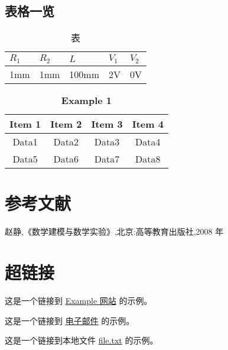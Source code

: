 \documentclass[12pt,a4paper]{article}%
\begin{document}
\subsection{表格一览}
\begin{table}[H]%
	\centering
	\begin{tabular}{|l|l|l|l|l|}
		\hline
		$R_1$ & $R_2$ & $L$ & $V_1$ & $V_2$ \\ \hline
		1mm & 1mm & 100mm & 2V & 0V \\ \hline
	\end{tabular}
\caption{\fontsize{10pt}{15pt}\selectfont 表}
\end{table}
\begin{table}[H]
	\caption{\textbf{Example 1}}%
	\centering%
	\begin{tabular}{cccc}%
	\toprule%
	Item 1&Item 2&Item 3&Item 4 \\
	\midrule%
	Data1&Data2&Data3&Data4 \\
	Data5&Data6&Data7&Data8 \\
	\bottomrule%
	\end{tabular}
\end{table}

\newpage
\section{参考文献}

\begin{thebibliography}{100}%

    赵静,《数学建模与数学实验》,北京:高等教育出版社,2008 年
    
   
\end{thebibliography}
\section{超链接}
这是一个链接到 \href{https://www.example.com}{Example 网站} 的示例。

这是一个链接到 \href{mailto:example@example.com}{电子邮件} 的示例。

这是一个链接到本地文件 \href{run:./file.txt}{file.txt} 的示例。
\end{document}
